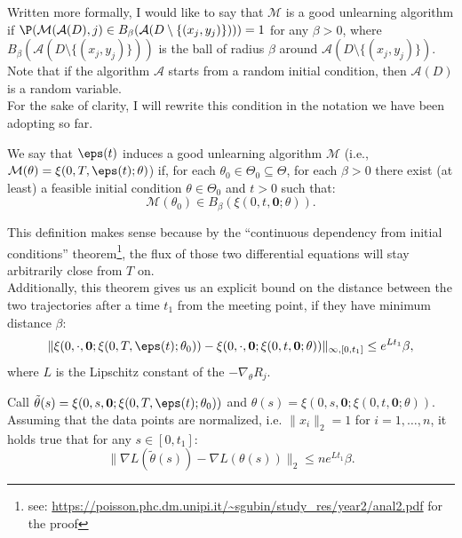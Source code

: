 Written more formally, I would like to say that $\mathcal{M}$ is a good unlearning algorithm if $\P(\mathcal{M}(\mathcal{A}(D),j)\in B_\beta(\mathcal{A}(D\setminus\{(x_j,y_j)\})))=1$ for any $\beta>0$,
where $B_\beta(\mathcal{A}(D\setminus\{(x_j,y_j)\}))$ is the ball of radius $\beta$ around $\mathcal{A}(D\setminus\{(x_j,y_j)\})$.
Note that if the algorithm $\mathcal{A}$ starts from a random initial condition, then $\mathcal{A}(D)$ is a random variable.\\
For the sake of clarity, I will rewrite this condition in the notation we have been adopting so far.
\begin{definition*}\label{def:1}
    We say that $\eps(t)$ induces a good unlearning algorithm $\mathcal{M}$ (i.e., $\mathcal{M}(\theta)=\xi(0,T,\eps(t);\theta)$) if, for each $\theta_0\in\Theta_0\subseteq\Theta$, 
    for each $\beta>0$ there exist (at least) a feasible initial condition $\theta\in\Theta_0$ and $t>0$ such that:
    $$ \mathcal{M}(\theta_0)\in B_\beta (\xi(0,t,\boldsymbol{0};\theta)) .$$
\end{definition*}

This definition makes sense because by the ``continuous dependency from initial condi\-tions'' theorem\footnote{see: \url{https://poisson.phc.dm.unipi.it/~sgubin/study_res/year2/anal2.pdf} for the proof}, the flux of those two differential equations will stay arbitrarily close from $T$ on. \\
Additionally, this theorem gives us an explicit bound on the distance between the two trajectories after a time $t_1$ from the meeting point, if they have minimum distance $\beta$:
\begin{equation*}
  \|\xi(0,\cdot,\boldsymbol{0};\xi(0,T,\eps(t);\theta_0)) - \xi(0,\cdot,\boldsymbol{0};\xi(0,t,\boldsymbol{0};\theta))\|_{\infty,[0,t_1]} \leq e^{L t_1} \beta,
\end{equation*}
where $L$ is the Lipschitz constant of the $-\nabla_\theta R_j$.

\begin{lemma}
  Call $\tilde{\theta}(s) = \xi(0,s,\boldsymbol{0};\xi(0,T,\eps(t);\theta_0))$ and $\theta(s) = \xi(0,s,\boldsymbol{0};\xi(0,t,\boldsymbol{0};\theta))$.
  Assuming that the data points are normalized, i.e. $\|x_i\|_2=1$ for $i=1,\dots,n$, it holds true that for any $s\in[0,t_1]$:
  \begin{equation*}
    \| \nabla L(\tilde{\theta}(s)) - \nabla L(\theta(s)) \|_2 \leq n e^{L t_1} \beta.
  \end{equation*}
\end{lemma}

